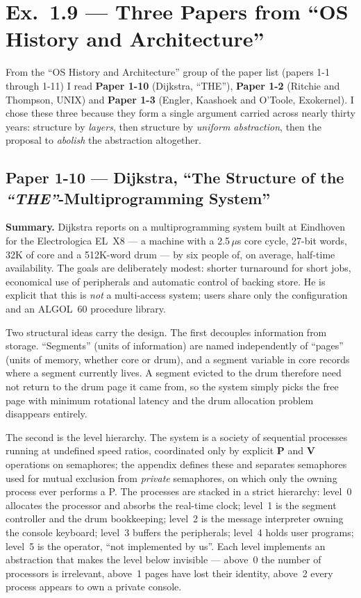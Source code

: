 \section*{Ex.\ 1.9 --- Three Papers from ``OS History and Architecture''}
\label{p3:sec:ex19}

From the ``OS History and Architecture'' group of the paper list (papers 1-1 through 1-11)
I read \textbf{Paper 1-10} (Dijkstra, ``THE''), \textbf{Paper 1-2} (Ritchie and Thompson,
UNIX) and \textbf{Paper 1-3} (Engler, Kaashoek and O'Toole, Exokernel). I chose these three
because they form a single argument carried across nearly thirty years: structure by
\emph{layers}, then structure by \emph{uniform abstraction}, then the proposal to
\emph{abolish} the abstraction altogether.

\subsection*{Paper 1-10 --- Dijkstra, ``The Structure of the \textit{``THE''}-Multiprogramming System''}
\label{p3:sec:the}

\textbf{Summary.}
Dijkstra reports on a multiprogramming system built at Eindhoven for the Electrologica
EL~X8 --- a machine with a 2.5\,$\mu$s core cycle, 27-bit words, 32K of core and a
512K-word drum --- by six people of, on average, half-time availability. The goals are
deliberately modest: shorter turnaround for short jobs, economical use of peripherals and
automatic control of backing store. He is explicit that this is \emph{not} a multi-access
system; users share only the configuration and an ALGOL~60 procedure library.

Two structural ideas carry the design. The first decouples information from storage.
``Segments'' (units of information) are named independently of ``pages'' (units of memory,
whether core or drum), and a segment variable in core records where a segment currently
lives. A segment evicted to the drum therefore need not return to the drum page it came
from, so the system simply picks the free page with minimum rotational latency and the drum
allocation problem disappears entirely.

The second is the level hierarchy. The system is a society of sequential processes running
at undefined speed ratios, coordinated only by explicit \textbf{P} and \textbf{V} operations
on semaphores; the appendix defines these and separates semaphores used for mutual exclusion
from \emph{private} semaphores, on which only the owning process ever performs a P. The
processes are stacked in a strict hierarchy: level~0 allocates the processor and absorbs the
real-time clock; level~1 is the segment controller and the drum bookkeeping; level~2 is the
message interpreter owning the console keyboard; level~3 buffers the peripherals; level~4
holds user programs; level~5 is the operator, ``not implemented by us''. Each level
implements an abstraction that makes the level below invisible --- above~0 the number of
processors is irrelevant, above~1 pages have lost their identity, above~2 every process
appears to own a private console.

